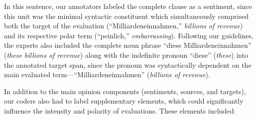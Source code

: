 In this sentence, our annotators labeled the complete clause as a
sentiment, since this unit was the minimal syntactic constituent which
simultaneously comprised both the target of the evaluation
(``Milliardeneinnahmen,'' \emph{billions of revenue}) and its
respective polar term (``peinlich,'' \emph{embarrassing}).
Following our guidelines, the experts also included the complete noun
phrase ``diese Milliardeneinnahmen'' (\emph{these billions of
  revenue}) along with the indefinite pronoun ``diese'' (\emph{these})
into the annotated target span, since the pronoun was syntactically
dependent on the main evaluated term---``Milliardeneinnahmen''
(\emph{billions of revenue}).

In addition to the main opinion components (sentiments, sources, and
targets), our coders also had to label supplementary elements, which
could significantly influence the intensity and polarity of
evaluations.  These elements included:

